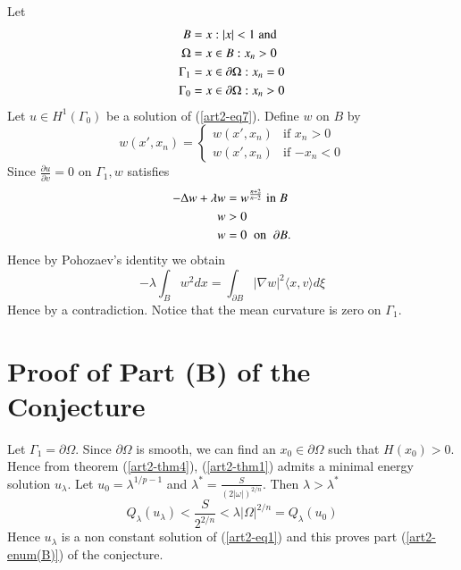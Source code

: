 \begin{sketch of the proof}
\begin{enumerate}[\rm \bf Step 1.]
\begin{example}
Let  
\begin{align*} 
B &={x : |x| < 1}\; {\rm and}\\
\Omega &= {x \in B : x_{n} > 0}\\
\Gamma_{1} &= {x\in \partial \Omega : x_{n} = 0}\\
\Gamma_{0} &= {x\in \partial \Omega : x_{n} > 0}
\end{align*}
Let $u\in H^{1}(\Gamma_{0})$ be a solution of (\ref{art2-eq7}). Define $w$ on $B$ by
\begin{equation*}
w(x', x_{n}) = 
\begin{cases}
w(x', x_{n}) & \text{if $x_{n} > 0$}\\
w(x', x_{n}) & \text{if $-x_{n}< 0$}
\end{cases}
\end{equation*}
Since $\frac{\partial u}{\partial v} = 0$  on $ \Gamma_{1}, w$ satisfies 
\begin{align*}
-\Delta w + \lambda w &= w^{\frac{n+2}{n-2}}\; {\rm in}\; B\\
w &> 0\\
w &= 0 \;\;\text{on}\;\; \partial B.
\end{align*}
Hence by Pohozaev's identity we obtain
$$
-\lambda \int_{B} w^{2} dx = \int_{\partial B} |\nabla w|^{2} \langle x, v\rangle d\xi 
$$
Hence by a contradiction. Notice that the mean curvature is zero on $\Gamma_{1}$.
\end{example}
\end{enumerate}
\end{sketch of the proof}

\section*{Proof of Part (B) of the Conjecture}

Let $\Gamma_{1} = \partial\Omega$. Since $\partial\Omega$ is smooth, we can find an $x_{0} \in \partial\Omega$ such that $H(x_{0})> 0$. Hence from theorem (\ref{art2-thm4}), (\ref{art2-thm1}) admits a minimal energy solution $u_{\lambda}$. Let $u_{0} = \lambda^{1/p-1}$ and $\lambda^* = \frac{S}{(2|\omega|)^{2/n}}$. Then  $\lambda > \lambda^*$
$$
Q_{\lambda}(u_{\lambda}) < \dfrac{S}{2^{2/n}}< \lambda|\Omega|^{2/n} = Q_{\lambda}(u_{0})
$$
Hence $u_{\lambda}$ is a non constant solution of (\ref{art2-eq1}) and this proves part (\ref{art2-enum(B)}) of the conjecture.


